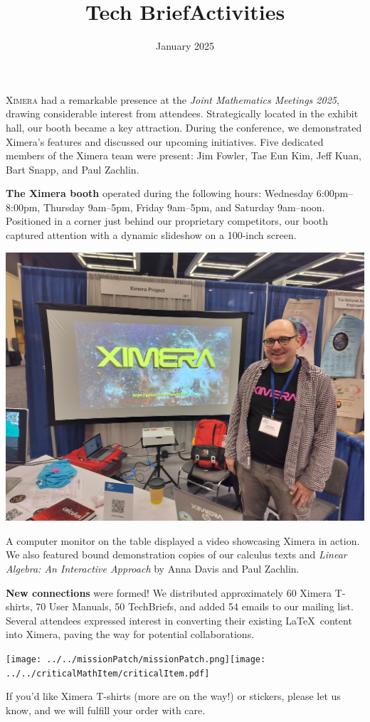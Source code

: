 \documentclass{techbrief}
\title{Tech Brief}
\title{Activities}
\date{January 2025}
\begin{document}
\pagestyle{main}
\thispagestyle{title}
\noindent

\lettrine[lines=2]{X}{imera} had a remarkable presence at the \textit{Joint
    Mathematics Meetings 2025}, drawing considerable interest from attendees.
Strategically located in the exhibit hall, our booth became a key attraction.
During the conference, we demonstrated Ximera's features and discussed our
upcoming initiatives. Five dedicated members of the Ximera team were present:
Jim Fowler, Tae Eun Kim, Jeff Kuan, Bart Snapp, and Paul Zachlin.

\begin{xframe}
    {\textbf{The Ximera booth}} operated during the following hours: Wednesday
    6:00pm--8:00pm, Thursday 9am--5pm, Friday 9am--5pm, and Saturday 9am--noon.
    Positioned in a corner just behind our proprietary competitors, our booth
    captured attention
    with a dynamic slideshow on a 100-inch screen.
    \begin{center}
        \includegraphics[width=.9\textwidth]{booth.jpg}
    \end{center}
    A computer monitor on the table displayed a video showcasing Ximera in
    action. We also featured bound demonstration copies of our calculus texts
    and
    \textit{Linear Algebra: An Interactive Approach} by Anna Davis and Paul
    Zachlin. 
\end{xframe}

\begin{xframe}
    {\bf New connections} were formed! We distributed approximately 60
    Ximera T-shirts, 70 User Manuals, 50 TechBriefs, and added 54 emails to our
    mailing list. Several attendees expressed interest in converting their
    existing
    \LaTeX\ content into Ximera, paving the way for potential collaborations.
    \begin{center}

        \texttt{[image: ../../missionPatch/missionPatch.png]}\qquad\texttt{[image: ../../criticalMathItem/criticalItem.pdf]}
    \end{center}
    If you'd like Ximera T-shirts (more are on the way!) or stickers, please
    let us know, and we will
    fulfill your order with care. 
\end{xframe}
\end{document}
